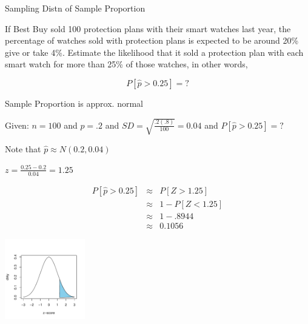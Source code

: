\documentclass[14pt]{beamer}\usepackage[]{graphicx}\usepackage[]{color}
\begin{document}
\begin{frame}[fragile]{Sampling Distn of Sample Proportion}

If Best Buy sold 100 protection plans with their smart watches last year, the percentage of watches sold with protection plans is expected to be around 20\% give or take 4\%.  Estimate the likelihood that it sold a protection plan with each smart watch  for more  than 25\% of those watches, in other words,

\begin{equation*}
  P[ \hat{p} > 0.25] = ?
\end{equation*}
\end{frame}

\begin{frame}[fragile]{Sample Proportion is approx. normal}

\begin{minipage}[ht]{6cm}

Given: $n = 100$ and $p = .2$ and 
$SD = \sqrt{ \frac{.2(.8)}{100}} = 0.04$ and
$P[ \hat{p} > 0.25] = ?$ 

Note that $\hat{p} \approx N( 0.2, 0.04)$

$z = \frac{0.25 - 0.2}{0.04} = 1.25$

{\small{
\begin{eqnarray*}
P[ \hat{p} > 0.25] & \approx & P[ Z > 1.25] \\
& \approx & 1 - P[Z < 1.25] \\
& \approx & 1 - .8944 \\
& \approx & 0.1056
\end{eqnarray*}
}}
\end{minipage} \hfill
\begin{minipage}[ht]{4cm}


\includegraphics[width=3.5cm]{figure/LBL8a-1} 


\end{minipage}
\end{frame}
\end{document}
